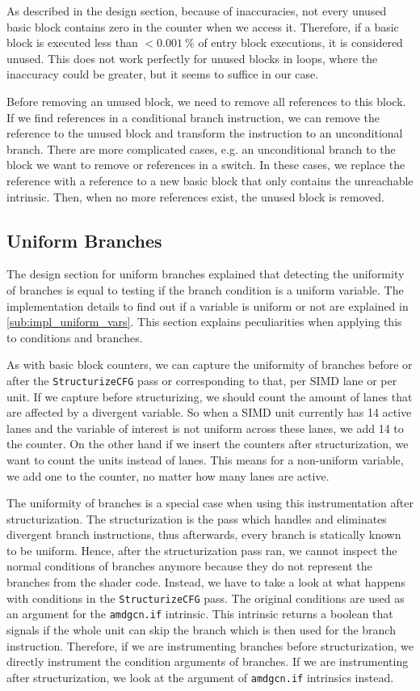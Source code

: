 As described in the design section, because of inaccuracies, not every unused basic block contains zero in the counter when we access it.
Therefore, if a basic block is executed less than $< \SI{0.001}{\percent}$ of entry block executions, it is considered unused.
This does not work perfectly for unused blocks in loops, where the inaccuracy could be greater, but it seems to suffice in our case.

Before removing an unused block, we need to remove all references to this block.
If we find references in a conditional branch instruction, we can remove the reference to the unused block and transform the instruction to an unconditional branch.
There are more complicated cases, e.g. an unconditional branch to the block we want to remove or references in a switch.
In these cases, we replace the reference with a reference to a new basic block that only contains the unreachable intrinsic.
Then, when no more references exist, the unused block is removed.

\subsection{Uniform Branches}
\label{sub:impl_uniform_branches}
The design section for uniform branches explained that detecting the uniformity of branches is equal to testing if the branch condition is a uniform variable.
The implementation details to find out if a variable is uniform or not are explained in \cref{sub:impl_uniform_vars}.
This section explains peculiarities when applying this to conditions and branches.

As with basic block counters, we can capture the uniformity of branches before or after the \texttt{StructurizeCFG} pass or corresponding to that, per SIMD lane or per unit.
If we capture before structurizing, we should count the amount of lanes that are affected by a divergent variable.
So when a SIMD unit currently has 14 active lanes and the variable of interest is not uniform across these lanes, we add 14 to the counter.
On the other hand if we insert the counters after structurization, we want to count the units instead of lanes.
This means for a non-uniform variable, we add one to the counter, no matter how many lanes are active.

The uniformity of branches is a special case when using this instrumentation after structurization.
The structurization is the pass which handles and eliminates divergent branch instructions, thus afterwards, every branch is statically known to be uniform.
Hence, after the structurization pass ran, we cannot inspect the normal conditions of branches anymore because they do not represent the branches from the shader code.
Instead, we have to take a look at what happens with conditions in the \texttt{StructurizeCFG} pass.
The original conditions are used as an argument for the \texttt{amdgcn.if} intrinsic.
This intrinsic returns a boolean that signals if the whole unit can skip the branch which is then used for the branch instruction.
Therefore, if we are instrumenting branches before structurization, we directly instrument the condition arguments of branches.
If we are instrumenting after structurization, we look at the argument of \texttt{amdgcn.if} intrinsics instead.

